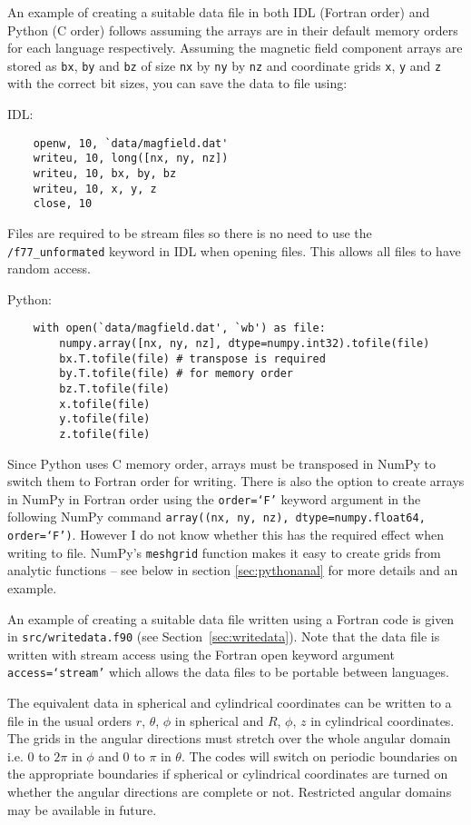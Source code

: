 \documentclass[12pt]{article}
\begin{document}
    An example of creating a suitable data file in both IDL (Fortran order) and Python (C order) follows assuming the arrays are in their default memory orders for each language respectively. Assuming the magnetic field component arrays are stored as \texttt{bx}, \texttt{by} and \texttt{bz} of size \texttt{nx} by \texttt{ny} by \texttt{nz} and coordinate grids \texttt{x}, \texttt{y} and \texttt{z} with the correct bit sizes, you can save the data to file using:

    IDL:

    \begin{verbatim}
    openw, 10, `data/magfield.dat'
    writeu, 10, long([nx, ny, nz])
    writeu, 10, bx, by, bz
    writeu, 10, x, y, z
    close, 10
    \end{verbatim}
    Files are required to be stream files so there is no need to use the \texttt{/f77\_unformated} keyword in IDL when opening files. This allows all files to have random access.

    Python:

    \begin{verbatim}
    with open(`data/magfield.dat', `wb') as file:
        numpy.array([nx, ny, nz], dtype=numpy.int32).tofile(file)
        bx.T.tofile(file) # transpose is required
        by.T.tofile(file) # for memory order
        bz.T.tofile(file)
        x.tofile(file)
        y.tofile(file)
        z.tofile(file)
    \end{verbatim}

    Since Python uses C memory order, arrays must be transposed in NumPy to switch them to Fortran order for writing. There is also the option to create arrays in NumPy in Fortran order using the \texttt{order=`F'} keyword argument in the following NumPy command \texttt{array((nx, ny, nz), dtype=numpy.float64, order=`F')}. However I do not know whether this has the required effect when writing to file. NumPy's \texttt{meshgrid} function makes it easy to create grids from analytic functions -- see below in section \ref{sec:pythonanal} for more details and an example.

    An example of creating a suitable data file written using a Fortran code is given in \texttt{src/writedata.f90} (see Section~\ref{sec:writedata}). Note that the data file is written with stream access using the Fortran open keyword argument \texttt{access=`stream'} which allows the data files to be portable between languages.

    The equivalent data in spherical and cylindrical coordinates can be written to a file in the usual orders \( r \), \( \theta \), \( \phi \) in spherical and \( R \), \( \phi \), \( z \) in cylindrical coordinates. The grids in the angular directions must stretch over the whole angular domain i.e. \( 0 \) to \( 2\pi \) in \( \phi \) and \( 0 \) to \( \pi \) in \( \theta \). The codes will switch on periodic boundaries on the appropriate boundaries if spherical or cylindrical coordinates are turned on whether the angular directions are complete or not. Restricted angular domains may be available in future.
\end{document}
